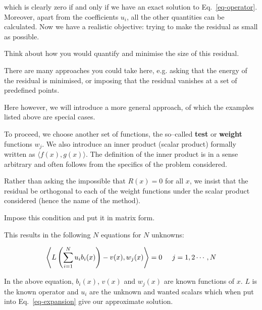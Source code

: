 which is clearly zero if and only if we have an exact solution to Eq.~\ref{eq-operator}. Moreover, apart from the coefficients $u_i$, all the other quantities can be calculated. Now we have a realistic objective: trying to make the residual as small as possible.

\begin{cue}
Think about how you would quantify and minimise the size of this residual. 
\end{cue}

There are many approaches you could take here, e.g. asking that the energy of the residual is minimised, or imposing that the residual vanishes at a set of predefined points.

Here however, we will introduce a more general approach, of which the examples listed above are special cases.

\noindent{}To proceed, we choose another set of functions, the so--called \textbf{test} or \textbf{weight} functions $w_j$. We also introduce an inner product (scalar product) formally written as $\langle f(x),g(x) \rangle$. The definition of the inner product is in a sense arbitrary and often follows from the specifics of the problem considered.

Rather than asking the impossible that $R(x)=0$ for all $x$, we insist that the residual be orthogonal to each of the weight functions under the scalar product considered (hence the name of the method).

\begin{cue}
Impose this condition and put it in matrix form.  
\end{cue}

This results in the following $N$ equations for $N$ unknowns:

\begin{equation}
\left\langle  L \left(\sum_{i=1}^N u_i b_i(x)\right) - v(x) , w_j(x) \right\rangle = 0 \hspace{0.5cm} j=1,2\cdots,N \label{eq-weighted-res}
\end{equation}

In the above equation, $b_i(x)$, $v(x)$ and $w_j(x)$ are known functions of $x$. $L$ is the known operator and $u_i$ are the unknown and wanted scalars which when put into Eq.~\ref{eq-expansion} give our approximate solution.

